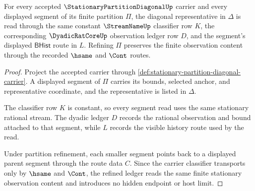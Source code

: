 \begin{theorem}
\label{thm:stationary-partition-diagonal-window-exactness}
For every accepted $\StationaryPartitionDiagonalUp$ carrier and every displayed segment of its finite partition $\Pi$, the diagonal representative in $\Delta$ is read through the same constant $\StreamNameUp$ classifier row $K$, the corresponding $\DyadicRatCoreUp$ observation ledger row $D$, and the segment's displayed $\mathsf{BHist}$ route in $L$. Refining $\Pi$ preserves the finite observation content through the recorded $\hsame$ and $\Cont$ routes.
\end{theorem}
\begin{proof}
Project the accepted carrier through \autoref{def:stationary-partition-diagonal-carrier}. A displayed segment of $\Pi$ carries its bounds, selected anchor, and representative coordinate, and the representative is listed in $\Delta$.

The classifier row $K$ is constant, so every segment read uses the same stationary rational stream. The dyadic ledger $D$ records the rational observation and bound attached to that segment, while $L$ records the visible history route used by the read.

Under partition refinement, each smaller segment points back to a displayed parent segment through the route data $C$. Since the carrier classifier transports only by $\hsame$ and $\Cont$, the refined ledger reads the same finite stationary observation content and introduces no hidden endpoint or host limit.
\end{proof}


